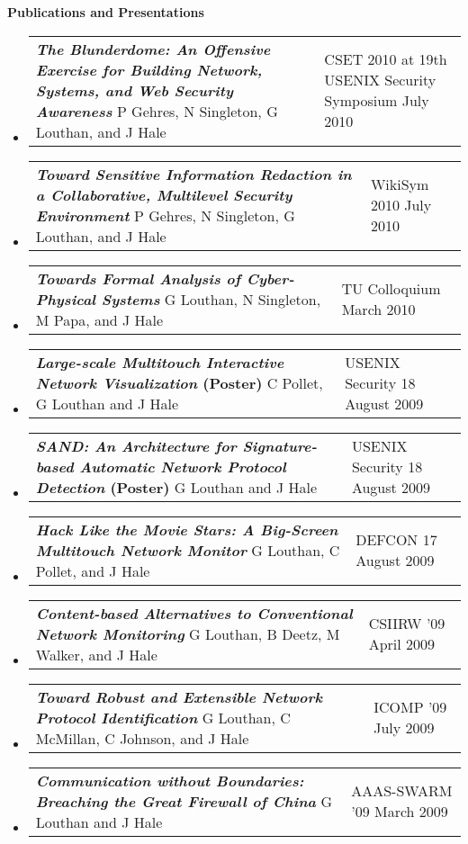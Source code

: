 \documentclass[letterpaper,11pt]{article}
\makeatletter
\newcommand{\resheading}[1]{{\large \colorbox{mygrey}{\begin{minipage}
    {\textwidth}{\textbf{#1 \vphantom{p\^{E}}}}\end{minipage}}}}
\newcommand{\resentry}[3][0pt]{
    \begin{tabular*}{0.9\textwidth}[t]{@{\hspace{#1}}p{5.0in}@{\extracolsep{\fill}}p{0.75in}}
        #2 & #3
        \tabularnewline
    \end{tabular*} %
}
\newcommand{\ressubheading}[4]{
    \resentry{\textbf{#1} \newline #3}{#2 \newline #4}    
}
\makeatother
\begin{document}
\resheading{Publications and Presentations}
\begin{itemize}
\item
	\ressubheading{\emph{The Blunderdome: An Offensive Exercise for Building Network, Systems, and Web Security Awareness}\footnotemark[1]}{CSET 2010 at 19th USENIX Security Symposium}{P Gehres, N Singleton, G Louthan, and J Hale}{July 2010}
\item
	\ressubheading{\emph{Toward Sensitive Information Redaction in a Collaborative, Multilevel Security Environment}\footnotemark[1]}{WikiSym 2010}{P Gehres, N Singleton, G Louthan, and J Hale}{July 2010}
\item
	\ressubheading{\emph{Towards Formal Analysis of Cyber-Physical Systems}}{TU Colloquium}{G Louthan, N Singleton, M Papa, and J Hale}{March 2010}
\item
	\ressubheading{\emph{Large-scale Multitouch Interactive Network Visualization} (Poster)}{USENIX Security 18}{C Pollet, G Louthan and J Hale}{August 2009}
\item
	\ressubheading{\emph{SAND: An Architecture for Signature-based Automatic Network Protocol Detection} (Poster)}{USENIX Security 18}{G Louthan and J Hale}{August 2009}
\item
	\ressubheading{\emph{Hack Like the Movie Stars: A Big-Screen Multitouch Network Monitor}}{DEFCON 17}{G Louthan, C Pollet, and J Hale}{August 2009}
\item
	\ressubheading{\emph{Content-based Alternatives to Conventional Network Monitoring}\footnotemark[1]}{CSIIRW '09}{G Louthan, B Deetz, M Walker, and J Hale}{April 2009}
\item
	\ressubheading{\emph{Toward Robust and Extensible Network Protocol Identification}\footnotemark[1]}{ICOMP '09}{G Louthan, C McMillan, C Johnson, and J Hale}{July 2009}
\item
	\ressubheading{\emph{Communication without Boundaries: Breaching the Great Firewall of China}}{AAAS-SWARM '09}{G Louthan and J Hale}{March 2009}
\end{itemize}

\end{document}
